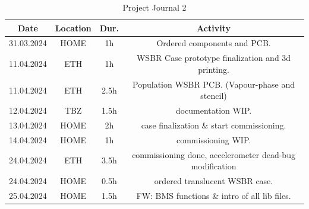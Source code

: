 \begin{table}[H]
    \centering
\begin{tabular}{||c | c | c || c||} 
 \hline
 Date &  Location & Dur. & Activity \\ [0.5ex] 
 \hline\hline
     31.03.2024 & HOME & 1h & Ordered components and PCB. \\ 
 \hline
     11.04.2024 & ETH & 1h & WSBR Case prototype finalization and 3d printing. \\ 
 \hline
     11.04.2024 & ETH & 2.5h & Population WSBR PCB. (Vapour-phase and stencil)\\ 
 \hline
     12.04.2024 & TBZ & 1.5h & documentation WIP. \\ 
 \hline
     13.04.2024 & HOME & 2h & case finalization \& start commissioning. \\ 
 \hline
     14.04.2024 & HOME & 1h & commissioning WIP. \\ 
 \hline
     24.04.2024 & ETH & 3.5h & commissioning done, accelerometer dead-bug modification \\ 
 \hline
     24.04.2024 & HOME & 0.5h & ordered translucent WSBR case. \\ 
 \hline
     25.04.2024 & HOME & 1.5h & FW: BMS functions \& intro of all lib files. \\ 
 \hline
\end{tabular}
    \caption{Project Journal 2}
    \label{tab:Project Journal 2}
\end{table}
